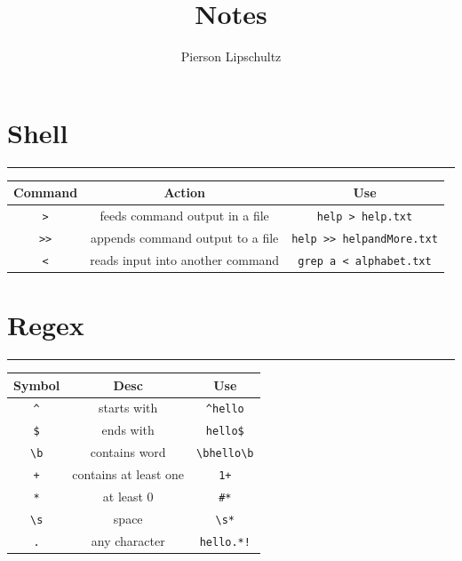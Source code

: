 \documentclass{article}
\title{Notes}
\author{Pierson Lipschultz}
\theoremstyle{mytheoremstyle}
\theoremstyle{mytheoremstyle}
\theoremstyle{myproblemstyle}
\theoremstyle{myproblemstyle}
\begin{document}
    \pagestyle{fancy}

    \fancyhf{}
    \fancyfoot[L]{\nouppercase{\leftmark}} %
    \fancyfoot[R]{\thepage}%

    \renewcommand{\headrulewidth}{0pt}
    \renewcommand{\footrulewidth}{0.4pt}
    \renewcommand{\sectionmark}[1]{\markboth{#1}{}}

    \maketitle
    \tableofcontents
    
    \pagebreak
    \section{Shell}
    \hrule
    \vspace{.5cm}

    \begin{center}
    \begin{tabular}{|c|c|c|}
    \hline
     Command & Action& Use\\
    \hline
      \verb|>| & feeds command output in a file& \verb|help > help.txt|\\ 
    \hline
      \verb|>>|&appends command output to a file & \verb|help >> helpandMore.txt|\\
    \hline 
      \verb|<| & reads input into another command & \verb|grep a < alphabet.txt|\\
    \hline
    \end{tabular}
    \end{center}

    \pagebreak
    \section{Regex}
    \hrule
    \vspace{.5cm}
    
    \begin{center}
    \begin{tabular}{|c|c|c|}
    \hline
    Symbol& Desc& Use\\
    \hline
    \verb|^| & starts with & \verb|^hello| \\ 
    \hline 
    \verb|$| & ends with & \verb|hello$| \\ 
    \hline 
    \verb|\b| & contains word  & \verb|\bhello\b| \\ 
    \hline 
    \verb|+| & contains at least one & \verb|1+| \\ 
    \hline 
    \verb|*| & at least 0 & \verb|#*| \\ 
    \hline 
    \verb|\s| & space & \verb|\s*| \\ 
    \hline 
    \verb|.| & any character & \verb|hello.*!|\\ 
    \hline 
    \end{tabular}
    \end{center}
\end{document}
